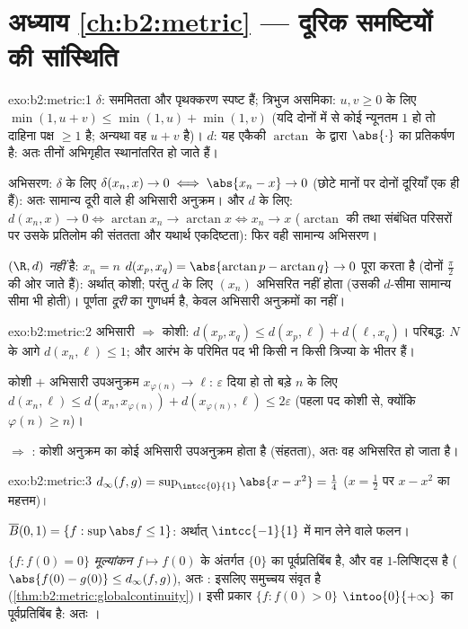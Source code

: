 \section*{अध्याय \ref{ch:b2:metric} --- दूरिक समष्टियों की सांस्थिति}

\begin{solution}{exo:b2:metric:1}
$\delta$: सममितता और पृथक्करण स्पष्ट हैं; त्रिभुज असमिका: $u, v \geq 0$ के लिए $\min(1, u + v) \leq \min(1,u) + \min(1,v)$
(यदि दोनों में से कोई न्यूनतम $1$ हो तो दाहिना पक्ष $\geq 1$ है; अन्यथा वह
$u + v$ है)। $d$: यह एकैकी $\arctan$ के द्वारा $\abs{\cdot}$ का प्रतिकर्षण है: अतः तीनों
अभिगृहीत स्थानांतरित हो जाते हैं।

अभिसरण: $\delta$ के लिए $\delta(x_n, x) \to 0 \iff \abs{x_n - x}
\to 0$ (छोटे मानों पर दोनों दूरियाँ एक ही हैं): अतः
सामान्य दूरी वाले ही अभिसारी अनुक्रम। और $d$ के लिए: $d(x_n, x) \to 0 \iff \arctan x_n \to
\arctan x \iff x_n \to x$ ($\arctan$ की तथा
संबंधित परिसरों पर उसके प्रतिलोम की संततता और यथार्थ एकदिष्टता): फिर
वही सामान्य अभिसरण।

$(\R, d)$  \emph{नहीं} है: $x_n = n$ $d(x_p, x_q)
= \abs{\arctan p - \arctan q} \to 0$ पूरा करता है (दोनों $\frac\pi2$ की ओर जाते
हैं): अर्थात् कोशी; परंतु $d$ के लिए $(x_n)$ अभिसरित नहीं होता (उसकी
$d$-सीमा सामान्य सीमा भी होती)। पूर्णता \emph{दूरी} का गुणधर्म है,
केवल अभिसारी अनुक्रमों का नहीं।
\end{solution}

\begin{solution}{exo:b2:metric:2}
अभिसारी $\Rightarrow$ कोशी: $d(x_p, x_q) \leq d(x_p, \ell) +
d(\ell, x_q)$। परिबद्ध: $N$ के आगे $d(x_n, \ell) \leq 1$; और आरंभ के परिमित पद
भी किसी न किसी त्रिज्या के भीतर हैं।

कोशी $+$ अभिसारी उपअनुक्रम $x_{\varphi(n)} \to \ell$: $\varepsilon$ दिया हो तो बड़े $n$ के लिए $d(x_n, \ell) \leq d(x_n,
x_{\varphi(n)}) + d(x_{\varphi(n)}, \ell) \leq 2\varepsilon$
(पहला पद कोशी से, क्योंकि $\varphi(n) \geq n$)।

 $\Rightarrow$ : कोशी अनुक्रम का कोई अभिसारी उपअनुक्रम होता है
(संहतता), अतः वह अभिसरित हो जाता है।
\end{solution}

\begin{solution}{exo:b2:metric:3}
$d_\infty(f, g) = \sup_{\intcc{0}{1}} \abs{x - x^2} = \frac14$ ($x = \frac12$ पर $x - x^2$ का महत्तम)।

$\overline B(0, 1) = \{f : \sup\abs f \leq 1\}$: अर्थात् $\intcc{-1}{1}$ में मान लेने वाले  फलन।

$\{f : f(0) = 0\}$ \emph{मूल्यांकन} $f \mapsto f(0)$ के अंतर्गत $\{0\}$ का पूर्वप्रतिबिंब है, और वह
$1$-लिप्शिट्स है ($\abs{f(0) - g(0)} \leq d_\infty(f,g)$), अतः : इसलिए समुच्चय संवृत है (\cref{thm:b2:metric:globalcontinuity})। इसी
प्रकार $\{f :
f(0) > 0\}$  $\intoo{0}{+\infty}$ का पूर्वप्रतिबिंब है: अतः ।
\end{solution}

